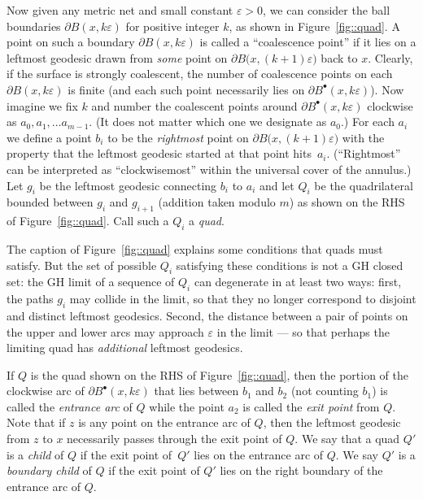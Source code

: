 \documentclass[10pt]{amsart}
\newcommand{\sbullet}{{\scriptscriptstyle\bullet}}
\let\epsilon\varepsilon
\theoremstyle{plain}
\numberwithin{theorem}{section}
\theoremstyle{definition}
\newcommand{\fb}[2]{B^\sbullet(#1,#2)}
\begin{document}
Now given any metric net and small constant $\epsilon>0$, we can consider the ball boundaries $\partial B(x,k\epsilon)$ for positive integer $k$, as shown in Figure~\ref{fig::quad}. A point on such a boundary $\partial B(x,k\epsilon)$ is called a ``coalescence point'' if it lies on a leftmost geodesic drawn from \emph{some} point on $\partial B\bigl(x,(k+1)\epsilon\bigr)$ back to $x$. Clearly, if the surface is strongly coalescent, the number of coalescence points on each $\partial B(x,k\epsilon)$ is finite (and each such point necessarily lies on $\partial \fb{x}{k\epsilon}$). Now imagine we fix $k$ and number the coalescent points around $\partial \fb{x}{k\epsilon}$ clockwise as $a_0, a_1, \ldots a_{m-1}$. (It does not matter which one we designate as $a_0$.) For each $a_i$ we define a point $b_i$ to be the \emph{rightmost} point on $\partial B\bigl(x,(k+1)\epsilon\bigr)$ with the property that the leftmost geodesic started at that point hits~$a_i$. (``Rightmost'' can be interpreted as ``clockwisemost'' within the universal cover of the annulus.) Let $g_i$ be the leftmost geodesic connecting $b_i$ to $a_i$ and let $Q_i$ be the quadrilateral bounded between $g_i$ and $g_{i+1}$ (addition taken modulo $m$) as shown on the RHS of Figure~\ref{fig::quad}. Call such a $Q_i$ a \emph{quad}.

The caption of Figure~\ref{fig::quad} explains some conditions that quads must satisfy. But the set of possible $Q_i$ satisfying these conditions is not a GH closed set: the GH limit of a sequence of $Q_i$ can degenerate in at least two ways: first, the paths $g_i$ may collide in the limit, so that they no longer correspond to disjoint and distinct leftmost geodesics. Second, the distance between a pair of points on the upper and lower arcs may approach $\epsilon$ in the limit --- so that perhaps the limiting quad has \emph{additional} leftmost geodesics.

If $Q$ is the quad shown on the RHS of Figure~\ref{fig::quad}, then the portion of the clockwise arc of $\partial \fb{x}{k\epsilon}$ that lies between $b_1$ and $b_2$ (not counting $b_1$) is called the \emph{entrance arc} of $Q$ while the point $a_2$ is called the \emph{exit point} from $Q$. Note that if $z$ is any point on the entrance arc of $Q$, then the leftmost geodesic from $z$ to $x$ necessarily passes through the exit point of $Q$. We say that a quad $Q'$ is a \emph{child} of $Q$ if the exit point of~$Q'$ lies on the entrance arc of $Q$. We say $Q'$ is a \emph{boundary child} of $Q$ if the exit point of $Q'$ lies on the right boundary of the entrance arc of $Q$.\enlargethispage{\baselineskip}%
\end{document}
